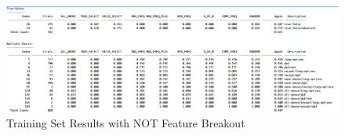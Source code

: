 \begin{figure}
\centering
\includegraphics[width=130mm]{version_1_training_set_results_not.png}
\caption{Training Set Results with NOT Feature Breakout}
\label{fig:version_1_training_set_results_not}
\end{figure}



